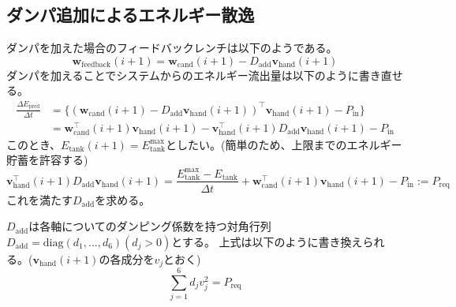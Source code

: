 \documentclass[uplatex]{jsarticle}
\begin{document}


\subsection{ダンパ追加によるエネルギー散逸}
ダンパを加えた場合のフィードバックレンチは以下のようである。
\begin{equation}
  \bm{w}_{\text{feedback}}(i+1) = \bm{w}_{\text{cand}}(i+1) - D_{\text{add}} \bm{v}_{\text{hand}}(i+1)
\end{equation}
ダンパを加えることでシステムからのエネルギー流出量は以下のように書き直せる。
\begin{equation}
\begin{split}
  \frac {\Delta E_{\text{pred}}}{\Delta t} &= \{(\bm{w}_{\text{cand}}(i+1) - D_{\text{add}} \bm{v}_{\text{hand}}(i+1))^\top \bm{v}_{\text{hand}}(i+1) - P_{\text{in}}\} \\
  &= \bm{w}_{\text{cand}}^\top(i+1) \bm{v}_{\text{hand}}(i+1) - \bm{v}_{\text{hand}}^\top(i+1) D_{\text{add}} \bm{v}_{\text{hand}}(i+1) - P_{\text{in}}
\end{split}
\end{equation}
このとき、$E_{\text{tank}}(i+1) = E_{\text{tank}}^{\text{max}}$としたい。(簡単のため、上限までのエネルギー貯蓄を許容する)
\begin{equation}
  \bm{v}_{\text{hand}}^\top(i+1) D_{\text{add}} \bm{v}_{\text{hand}}(i+1) = \frac{E_{\text{tank}}^{\text{max}} - E_{\text{tank}}}{\Delta t} + \bm{w}_{\text{cand}}^\top(i+1) \bm{v}_{\text{hand}}(i+1) - P_{\text{in}} := P_{\text{req}}
\end{equation}
これを満たす$D_{\text{add}}$を求める。

$D_{\text{add}}$は各軸についてのダンピング係数を持つ対角行列$D_{\text{add}} = \text{diag}(d_1, \ldots, d_6) (d_j > 0)$とする。
上式は以下のように書き換えられる。($\bm{v}_{\text{hand}}(i+1)$の各成分を$v_j$とおく)
\begin{equation}
  \sum_{j=1}^{6} d_j v_j^2 = P_{\text{req}}
\end{equation}
\end{document}
